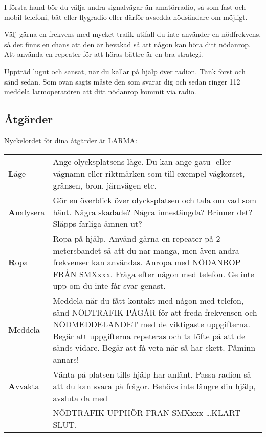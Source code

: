 I första hand bör du välja andra signalvägar än amatörradio, så som fast och
mobil telefoni, båt eller flygradio eller därför avsedda nödsändare om möjligt.

Välj gärna en frekvens med mycket trafik utifall du inte använder en
nödfrekvens, så det finns en chans att den är bevakad så att någon kan höra
ditt nödanrop. Att använda en repeater för att höras bättre är en bra strategi.

Uppträd lugnt och sansat, när du kallar på hjälp över radion.
Tänk först och sänd sedan.
Som ovan sagts måste den som svarar dig och sedan ringer 112 meddela
larmoperatören att ditt nödanrop kommit via radio.

\subsection{Åtgärder}

Nyckelordet för dina åtgärder är LARMA:

\begin{tabular}{lp{9cm}}
	\textbf{L}äge &
        Ange olycksplatsens läge.
        Du kan ange gatu- eller vägnamn eller riktmärken som
        till exempel vägkorset, gränsen, bron, järnvägen etc.
	\\
	\textbf{A}nalysera
	&
        Gör en överblick över olycksplatsen och tala om vad som hänt.
        Några skadade? Några innestängda?
        Brinner det? Släpps farliga ämnen ut?
	\\
	\textbf{R}opa &
        Ropa på hjälp.
        Använd gärna en repeater på 2-metersbandet så att du når många,
        men även andra frekvenser kan användas.
        Anropa med NÖDANROP FRÅN SMXxxx.
        Fråga efter någon med telefon.
        Ge inte upp om du inte får svar genast.
	\\
	\textbf{M}eddela &
        Meddela när du fått kontakt med någon med telefon, sänd NÖDTRAFIK PÅGÅR
        för att freda frekvensen och NÖDMEDDELANDET med de viktigaste
        uppgifterna.
        Begär att uppgifterna repeteras och ta löfte på att de sänds vidare.
        Begär att få veta när så har skett.
        Påminn annars!
	\\
	\textbf{A}vvakta &
        Vänta på platsen tills hjälp har anlänt.
        Passa radion så att du kan svara på frågor.
        Behövs inte längre din hjälp, avsluta då med\\
	& NÖDTRAFIK UPPHÖR FRAN SMXxxx \dots KLART SLUT.
\end{tabular}
